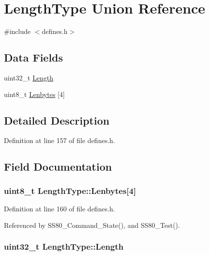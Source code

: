 \hypertarget{unionLengthType}{}\section{Length\+Type Union Reference}
\label{unionLengthType}


{\ttfamily \#include $<$defines.\+h$>$}

\subsection*{Data Fields}
\begin{DoxyCompactItemize}
\item 
uint32\+\_\+t \hyperlink{unionLengthType_a27186a51a0bcb9e93e44b9f1e49e5f27}{Length}
\item 
uint8\+\_\+t \hyperlink{unionLengthType_a51f62c21aa27a0cbe1c99de05e33fcf7}{Lenbytes} \mbox{[}4\mbox{]}
\end{DoxyCompactItemize}


\subsection{Detailed Description}


Definition at line 157 of file defines.\+h.



\subsection{Field Documentation}
\subsubsection[{\texorpdfstring{Lenbytes}{Lenbytes}}]{\setlength{\rightskip}{0pt plus 5cm}uint8\+\_\+t Length\+Type\+::\+Lenbytes\mbox{[}4\mbox{]}}\hypertarget{unionLengthType_a51f62c21aa27a0cbe1c99de05e33fcf7}{}\label{unionLengthType_a51f62c21aa27a0cbe1c99de05e33fcf7}


Definition at line 160 of file defines.\+h.



Referenced by S\+S80\+\_\+\+Command\+\_\+\+State(), and S\+S80\+\_\+\+Test().

\subsubsection[{\texorpdfstring{Length}{Length}}]{\setlength{\rightskip}{0pt plus 5cm}uint32\+\_\+t Length\+Type\+::\+Length}\hypertarget{unionLengthType_a27186a51a0bcb9e93e44b9f1e49e5f27}{}\label{unionLengthType_a27186a51a0bcb9e93e44b9f1e49e5f27}



